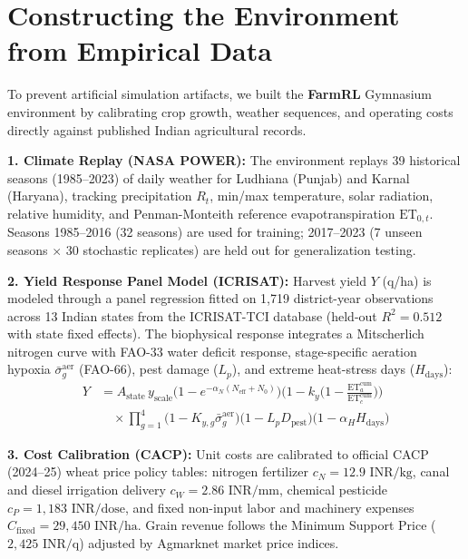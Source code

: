 \documentclass[10pt,twocolumn]{article}
\begin{document}
\section{Constructing the Environment from Empirical Data}
To prevent artificial simulation artifacts, we built the \textbf{FarmRL} Gymnasium environment by calibrating crop growth, weather sequences, and operating costs directly against published Indian agricultural records.

\textbf{1. Climate Replay (NASA POWER):}
The environment replays 39 historical seasons (1985--2023) of daily weather for Ludhiana (Punjab) and Karnal (Haryana), tracking precipitation $R_t$, min/max temperature, solar radiation, relative humidity, and Penman-Monteith reference evapotranspiration $\text{ET}_{0,t}$. Seasons 1985--2016 (32 seasons) are used for training; 2017--2023 (7 unseen seasons $\times$ 30 stochastic replicates) are held out for generalization testing.

\textbf{2. Yield Response Panel Model (ICRISAT):}
Harvest yield $Y$ (q/ha) is modeled through a panel regression fitted on 1,719 district-year observations across 13 Indian states from the ICRISAT-TCI database (held-out $R^2 = 0.512$ with state fixed effects). The biophysical response integrates a Mitscherlich nitrogen curve with FAO-33 water deficit response, stage-specific aeration hypoxia $\bar{\sigma}^{\text{aer}}_g$ (FAO-66), pest damage ($L_p$), and extreme heat-stress days ($H_{\text{days}}$):
\begin{equation}
\begin{aligned}
Y &= A_{\text{state}}\, y_{\text{scale}} \big(1 - e^{-\alpha_N (N_{\text{eff}} + N_0)}\big) \Big(1 - k_y\Big(1 - \tfrac{\text{ET}^{\text{cum}}_a}{\text{ET}^{\text{cum}}_c}\Big)\Big) \\
&\quad \times \prod_{g=1}^{4}\big(1 - K_{y,g}\bar{\sigma}^{\text{aer}}_g\big) \big(1 - L_p D_{\text{pest}}\big) \big(1 - \alpha_H H_{\text{days}}\big)
\end{aligned}
\end{equation}

\textbf{3. Cost Calibration (CACP):}
Unit costs are calibrated to official CACP (2024--25) wheat price policy tables: nitrogen fertilizer $c_N = 12.9\text{ INR/kg}$, canal and diesel irrigation delivery $c_W = 2.86\text{ INR/mm}$, chemical pesticide $c_P = 1{,}183\text{ INR/dose}$, and fixed non-input labor and machinery expenses $C_{\text{fixed}} = 29{,}450\text{ INR/ha}$. Grain revenue follows the Minimum Support Price ($2{,}425\text{ INR/q}$) adjusted by Agmarknet market price indices.
\end{document}

